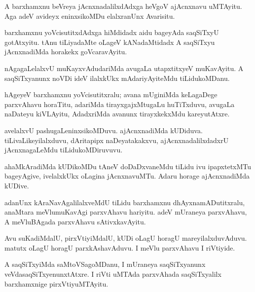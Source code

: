\documentclass{article}
\begin{document}
\begin{mn}
A barxhamxnu beVreya jAcnxnadalilxdAdxga heVgoV ajAcnxnavu
uMTAyitu. Aga adeV avideyx eninxsikoMDu elalxranUnx Avarisitu.
\end{mn}

\begin{mn}%
barxhamxnu yoVcisutitxdAdxga hiMdidadx aidu bageyAda saqSiTxyU
gotAtxyitu. tAnu tiLiyadaMte oLageV kANadaMtidadx A saqSiTxyu
jAcnxnadiMda horakekx goVcaravAyitu.
\end{mn}

\begin{mn}
nAgagaLelalxvU muKayxvAdudariMda avugaLa utapxtitxyeV muKavAyitu. A
saqSiTxyanunx noVDi ideV ilalxkUkx mAdariyAyiteMdu tiLidukoMDanu.
\end{mn}

\begin{mn}
hAgeyeV barxhamxnu yoVcisutitxralu; avana mUginiMda keLagaDege
parxvAhavu horaTitu, adariMda tirayxgajxMtugaLu huTiTxduvu, avugaLa
naDateyu kiVLAyitu, AdadxriMda avanunx tirayxkekxMdu kareyutAtxre.
\end{mn}

\begin{mn}
avelalxvU pashugaLeninxsikoMDuvu. ajAcnxnadiMda
kUDiduva. tiLivaLikeyilalxduvu, dAritapipx naDeyatakakxvu,
ajAcnxnadalilxdadxrU jAcnxnagaLeMdu tiLidukoMDiruvuvu.
\end{mn}

\begin{mn}
ahaMkAradiMda kUDikoMDu tAneV doDaDxvaneMdu tiLidu ivu ipapxtetxMTu
bageyAgive, ivelalxkUkx oLagina jAcnxnavuMTu. Adaru horage
ajAcnxnadiMda kUDive.
\end{mn}

\begin{mn}%
adanUnx kAraNavAgalilalxveMdU tiLidu barxhamxnu dhAyxnamADutitxralu,
anaMtara meVlumuKavAgi parxvAhavu hariyitu. adeV mUraneya parxvAhavu,
A meVluBAgada parxvAhavu sAtivxkavAyitu.
\end{mn}

\begin{mn}%
Avu suKadiMdalU, pirxVtiyiMdalU, kUDi oLagU horagU
mareyilalxduvAduvu. matutx oLagU horagU parxkAshavAduvu. I meVlu
parxvAhavu I riVtiyide.
\end{mn}

\begin{mn}
A saqSiTxyiMda saMtoVSagoMDanu, I mUraneya saqSiTxyanunx
veVdasaqSiTxyenunxtAtxre. I riVti uMTAda parxvAhada saqSiTxyalilx
barxhamxnige pirxVtiyuMTAyitu.
\end{mn}
\end{document}
